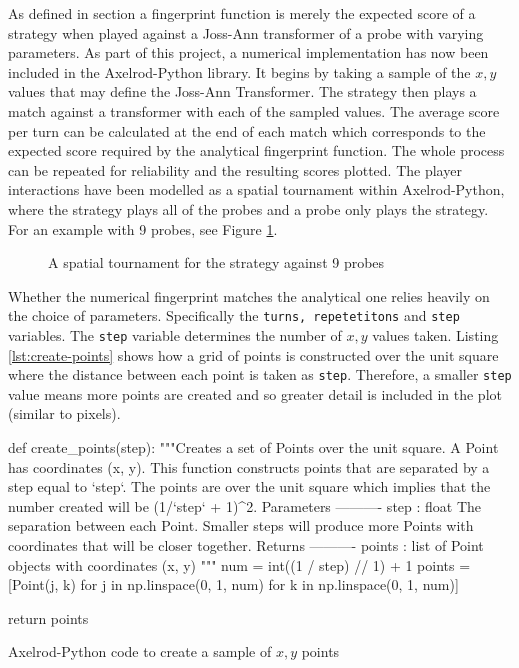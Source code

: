 As defined in section a fingerprint function is merely the expected score of a strategy when played against a Joss-Ann transformer of a probe with varying parameters. %
As part of this project, a numerical implementation has now been included in the Axelrod-Python library.
It begins by taking a sample of the $x,y$ values that may define the Joss-Ann Transformer.
The strategy then plays a match against a transformer with each of the sampled values.
The average score per turn can be calculated at the end of each match which corresponds to the expected score required by the analytical fingerprint function.
The whole process can be repeated for reliability and the resulting scores plotted.
The player interactions have been modelled as a spatial tournament within Axelrod-Python, where the strategy plays all of the probes and a probe only plays the strategy.
For an example with 9 probes, see Figure \ref{fig:spatialtourn}.

\begin{figure}[!hbtp]
    \begin{center}
        
        \caption{A spatial tournament for the strategy against 9 probes}\label{fig:spatialtourn}
    \end{center}
\end{figure}


Whether the numerical fingerprint matches the analytical one relies heavily on the choice of parameters.
Specifically the \texttt{turns, repetetitons} and \texttt{step} variables.
The \texttt{step} variable determines the number of $x,y$ values taken.
Listing \ref{lst:create-points} shows how a grid of points is constructed over the unit square where the distance between each point is taken as \texttt{step}.
Therefore, a smaller \texttt{step} value means more points are created and so greater detail is included in the plot (similar to pixels).

\begin{listing}[hbtp!]
\begin{SourceCode}
def create_points(step):
    """Creates a set of Points over the unit square.
    A Point has coordinates (x, y). This function constructs points that are
    separated by a step equal to `step`. The points are over the unit
    square which implies that the number created will be (1/`step` + 1)^2.
    Parameters
    ----------
    step : float
        The separation between each Point. Smaller steps will produce more
        Points with coordinates that will be closer together.
    Returns
    ----------
    points : list
        of Point objects with coordinates (x, y)
    """
    num = int((1 / step) // 1) + 1
    points = [Point(j, k) for j in np.linspace(0, 1, num)
              for k in np.linspace(0, 1, num)]

    return points
\end{SourceCode}
\caption{Axelrod-Python code to create a sample of $x,y$ points}
\label{lst:create-points}
\end{listing}

